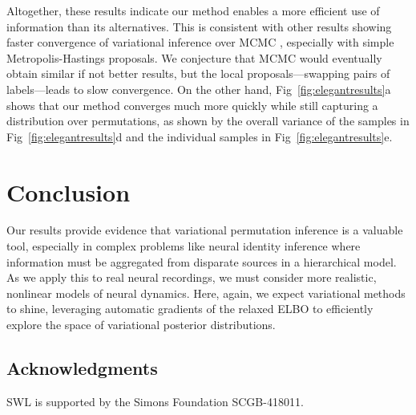 \documentclass[twoside]{article}
\begin{document}
Altogether, these results indicate our method enables a more efficient
use of information than its alternatives. This is consistent with
other results showing faster convergence of variational inference over
MCMC \citep{Blei2017}, especially with simple Metropolis-Hastings
proposals. We conjecture that MCMC would eventually obtain similar if
not better results, but the local proposals---swapping pairs of
labels---leads to slow convergence. On the other hand,
Fig~\ref{fig:elegantresults}a shows that our method converges much
more quickly while still capturing a distribution over permutations,
as shown by the overall variance of the samples in Fig~\ref{fig:elegantresults}d and the individual samples in Fig~\ref{fig:elegantresults}e.

\section{Conclusion}

Our results provide evidence that variational permutation
inference is a valuable tool, especially in complex
problems like neural identity inference where information must be
aggregated from disparate sources in a hierarchical model.  As we
apply this to real neural recordings, we must consider more realistic,
nonlinear models of neural dynamics. Here, again, we expect
variational methods to shine, leveraging automatic gradients of the
relaxed ELBO to efficiently explore the space of variational posterior
distributions.

\subsection*{Acknowledgments}

SWL is supported by the Simons Foundation SCGB-418011.






\pagebreak 
\appendix


\end{document}
